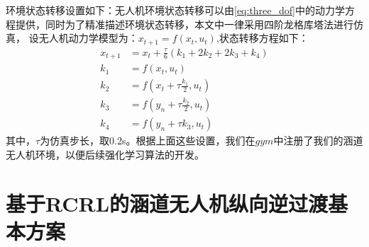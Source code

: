 环境状态转移设置如下：无人机环境状态转移可以由\autoref{eq:three_dof}中的动力学方程提供，同时为了精准描述环境状态转移，本文中一律采用四阶龙格库塔法进行仿真，
设无人机动力学模型为：$x_{t+1}=f\left(x_{t}, u_{t}\right)$,状态转移方程如下：
\begin{align}
    x_{t+1}&=x_{t}+\frac{\tau}{6}\left(k_{1}+2 k_{2}+2 k_{3}+k_{4}\right)\\
    k_{1} & =f\left(x_{t}, u_{t}\right) \\
    k_{2} & =f\left(x_{t}+\tau \frac{k_{1}}{2},u_{t}\right) \\
    k_{3} & =f\left(y_{n}+\tau \frac{k_{2}}{2}, u_{t}\right) \\
    k_{4} & =f\left(y_{n}+\tau k_{3}, u_{t}\right)
\end{align}
其中，$\tau$为仿真步长，取0.2s。根据上面这些设置，我们在$gym$中注册了我们的涵道无人机环境，以便后续强化学习算法的开发。
\section{基于RCRL的涵道无人机纵向逆过渡基本方案}


